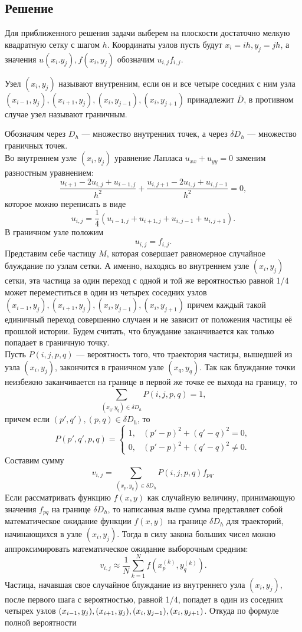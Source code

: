 \documentclass[11pt]{article}
\begin{document}
\subsection{Решение}
Для приближенного решения задачи выберем на плоскости достаточно мелкую квадратную сетку с шагом $h$. Координаты узлов пусть будут $x_i = ih,y_j = jh$, а значения $u(x_i.y_j),f(x_i,y_j)$ обозначим $u_{i,j}f_{i,j}$.
\begin{opr}
	Узел $(x_i,y_j)$ называют внутренним, если он и все четыре соседних с ним узла $(x_{i-1},y_j),(x_{i+1},y_j),(x_i,y_{j-1}),(x_i,y_{j+1})$ принадлежит $\overline{D}$, в противном случае узел называют граничным.
\end{opr}
Обозначим через $D_h$ --- множество внутренних точек, а через $\delta D_h$ --- множество граничных точек. \\
Во внутреннем  узле $(x_i,y_j)$ уравнение Лапласа $u_{xx} + u_{yy} = 0$ заменим разностным уравнением:
\[ \frac{u_{i+1} - 2u_{i,j} + u_{i-1,j}}{h^2} + \frac{u_{i,j+1} -2u_{i,j} + u_{i,j-1}}{h^2} = 0, \]
которое можно переписать в виде
\[u_{i,j} = \frac{1}{4}(u_{i-1,j} + u_{i+1,j} + u_{i,j-1} + u_{i,j+1}).  \]
В граничном узле положим
\[u_{i,j} = f_{i,j}. \]
Представим себе частицу $M$, которая совершает равномерное случайное блуждание по узлам сетки. А именно, находясь во внутреннем узле $(x_i,y_j)$ сетки, эта частица за один переход с одной и той же вероятностью равной 1/4 может переместиться в один из четырех соседних узлов $(x_{i-1},y_j),(x_{i+1},y_j),(x_i,y_{j-1}),(x_i,y_{j+1})$ причем каждый такой единичный переход совершенно случаен и не зависит от положения частицы её прошлой истории. Будем считать, что блуждание заканчивается как только попадает в граничную точку.\\
Пусть $P(i,j,p,q)$ --- вероятность того, что траектория частицы, вышедшей из узла $(x_i,y_j)$, закончится в граничном узле $(x_q,y_q)$. Так как блуждание точки неизбежно заканчивается на границе в первой же точке ее выхода на границу, то 
\[ \sum_{(x_q,y_q) \in \delta D_h}^{}P(i,j,p,q) = 1, \]
причем если $(p',q'),(p,q)\in \delta D_h$, то 
\[ P(p',q',p,q) = \begin{cases}
1, & (p' - p)^2 + (q' - q)^2 =0,\\
0, & (p' - p)^2 + (q' - q)^2 \neq 0. 
\end{cases} \]
Составим сумму
\[ v_{i,j} = \sum_{(x_p,y_q)\in \delta D_h}^{}P(i,j,p,q)f_{pq}. \]
Если рассматривать функцию $f(x,y)$ как случайную величину, принимающую значения $f_{pq}$ на границе $\delta D_h$, то написанная выше сумма представляет собой математическое ожидание функции $f(x,y)$ на границе $\delta D_h$ для траекторий, начинающихся в узле $(x_i,y_j)$. Тогда в силу закона больших чисел можно аппроксимировать математическое ожидание выборочным средним:
\[ v_{i,j} \approx \frac{1}{N}\sum_{k = 1}^{N} f(x_p^{(k)},y_q^{(k)}). \]
Частица, начавшая свое случайное блуждание из внутреннего узла $(x_i,y_j)$, после первого шага с вероятностью, равной 1/4, попадет в один из соседних четырех узлов $(x_{i-1},y_j),(x_{i+1},y_j), \\ (x_i,y_{j-1}),(x_i,y_{j+1})$. Откуда по формуле полной вероятности
\end{document}
